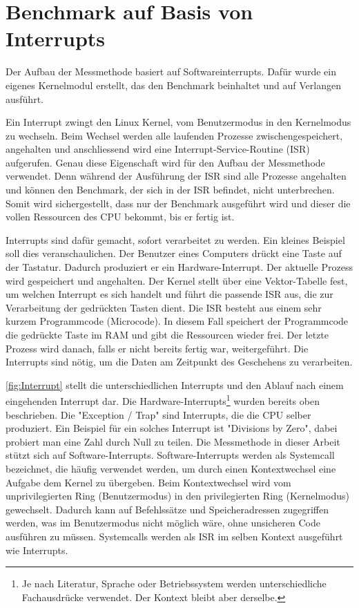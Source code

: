 
\section{Benchmark auf Basis von Interrupts}
\label{chap:benchmark_basis_interrupts}



Der Aufbau der Messmethode basiert auf Softwareinterrupts. Dafür wurde ein eigenes Kernelmodul erstellt, das den Benchmark beinhaltet und auf Verlangen ausführt.
\par
Ein Interrupt zwingt den Linux Kernel, vom Benutzermodus in den Kernelmodus zu wechseln\cite{Mandl2010_3}. Beim Wechsel werden alle laufenden Prozesse zwischengespeichert, angehalten und anschliessend wird eine Interrupt-Service-Routine (ISR) aufgerufen. Genau diese Eigenschaft wird für den Aufbau der Messmethode verwendet. Denn während der Ausführung der ISR sind alle Prozesse angehalten und können den Benchmark, der sich in der ISR befindet, nicht unterbrechen. Somit wird sichergestellt, dass nur der Benchmark ausgeführt wird und dieser die vollen Ressourcen des CPU bekommt, bis er fertig ist.
\par
Interrupts sind dafür gemacht, sofort verarbeitet zu werden. Ein kleines Beispiel soll dies veranschaulichen. Der Benutzer eines Computers drückt eine Taste auf der Tastatur. Dadurch produziert er ein Hardware-Interrupt. Der aktuelle Prozess wird gespeichert und angehalten. Der Kernel stellt über eine Vektor-Tabelle fest, um welchen Interrupt es sich handelt und führt die passende ISR aus, die zur Verarbeitung der gedrückten Tasten dient. Die ISR besteht aus einem sehr kurzem Programmcode (Microcode). In diesem Fall speichert der Programmcode die gedrückte Taste im RAM und gibt die Ressourcen wieder frei. Der letzte Prozess wird danach, falls er nicht bereits fertig war, weitergeführt. Die Interrupts sind nötig, um die Daten am Zeitpunkt des Geschehens zu verarbeiten.
\par
\autoref{fig:Interrupt} stellt die unterschiedlichen Interrupts und den Ablauf nach einem eingehenden Interrupt dar. Die Hardware-Interrupts\footnote{Je nach Literatur, Sprache oder Betriebssystem werden unterschiedliche Fachausdrücke verwendet. Der Kontext bleibt aber derselbe.} wurden bereits oben beschrieben. Die "Exception / Trap" sind Interrupts, die die CPU selber produziert. Ein Beispiel für ein solches Interrupt ist "Divisions by Zero", dabei probiert man eine Zahl durch Null zu teilen. Die Messmethode in dieser Arbeit stützt sich auf Software-Interrupts. Software-Interrupts werden als Systemcall bezeichnet, die häufig verwendet werden, um durch einen Kontextwechsel eine Aufgabe dem Kernel zu übergeben. Beim Kontextwechsel wird vom unprivilegierten Ring (Benutzermodus) in den privilegierten Ring (Kernelmodus) gewechselt. Dadurch kann auf Befehlssätze und Speicheradressen zugegriffen werden, was im Benutzermodus nicht möglich wäre, ohne unsicheren Code ausführen zu müssen. Systemcalls werden als ISR im selben Kontext ausgeführt wie Interrupts.

